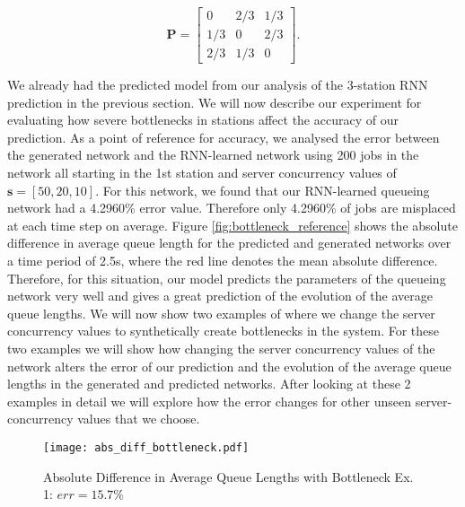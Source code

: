\documentclass[a4paper,11pt,titlepage]{article}
\begin{document}
\begin{equation}
    \mathbf{P} = \begin{bmatrix}
     0 & 2/3 & 1/3 \\
     1/3 & 0 & 2/3 \\
     2/3 & 1/3 & 0
    \end{bmatrix}.
\end{equation}

We already had the predicted model from our analysis of the 3-station RNN prediction in the previous section. We will now describe our experiment for evaluating how severe bottlenecks in stations affect the accuracy of our prediction. As a point of reference for accuracy, we analysed the error between the generated network and the RNN-learned network using 200 jobs in the network all starting in the 1st station and server concurrency values of $\mathbf{s} = [50,20,10]$. For this network, we found that our RNN-learned queueing network had a 4.2960\% error value. Therefore only 4.2960\% of jobs are misplaced at each time step on average. Figure \ref{fig:bottleneck_reference} shows the absolute difference in average queue length for the predicted and generated networks over a time period of 2.5s, where the red line denotes the mean absolute difference. Therefore, for this situation, our model predicts the parameters of the queueing network very well and gives a great prediction of the evolution of the average queue lengths. We will now show two examples of where we change the server concurrency values to synthetically create bottlenecks in the system. For these two examples we will show how changing the server concurrency values of the network alters the error of our prediction and the evolution of the average queue lengths in the generated and predicted networks. After looking at these 2 examples in detail we will explore how the error changes for other unseen server-concurrency values that we choose. \\

\begin{figure}[h!]
\begin{center}
\texttt{[image: abs\_diff\_bottleneck.pdf]}
\caption{Absolute Difference in Average Queue Lengths with Bottleneck Ex. 1: $err = 15.7\%$}
\label{fig:bottleneck_ex_1}
\end{center}
\end{figure}
\end{document}
